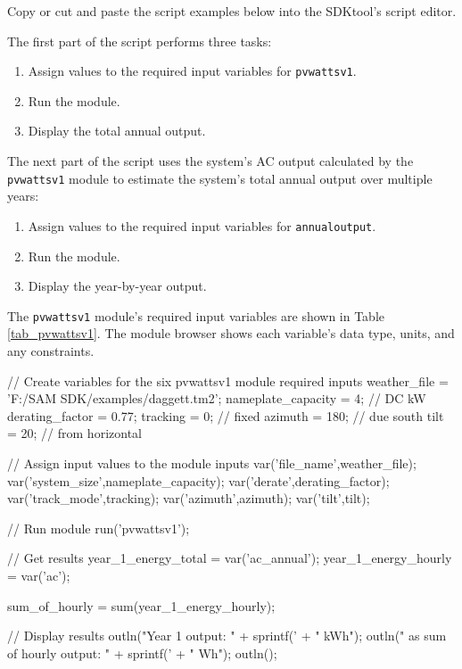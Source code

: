 \documentclass{scrartcl} %
\begin{document}
Copy or cut and paste the script examples below into the SDKtool's script editor.

The first part of the script performs three tasks:

\begin{enumerate}
\item Assign values to the required input variables for \texttt{pvwattsv1}.
\item Run the module.
\item Display the total annual output.
\end{enumerate}

The next part of the script uses the system's AC output calculated by the \texttt{pvwattsv1} module to estimate the system's total annual output over multiple years:

\begin{enumerate}
\item Assign values to the required input variables for \texttt{annualoutput}.
\item Run the module.
\item Display the year-by-year output.
\end{enumerate}

The \texttt{pvwattsv1} module's required input variables are shown in Table \ref{tab_pvwattsv1}. The module browser shows each variable's data type, units, and any constraints.

\begin{verbatimtab}

// Create variables for the six pvwattsv1 module required inputs
weather_file = 'F:/SAM SDK/examples/daggett.tm2';
nameplate_capacity = 4; // DC kW
derating_factor = 0.77;
tracking = 0; // fixed
azimuth = 180; // due south
tilt = 20; // from horizontal

// Assign input values to the module inputs
var('file_name',weather_file);
var('system_size',nameplate_capacity);
var('derate',derating_factor);
var('track_mode',tracking);
var('azimuth',azimuth);
var('tilt',tilt);

// Run module
run('pvwattsv1');

// Get results
year_1_energy_total = var('ac_annual');
year_1_energy_hourly = var('ac');

sum_of_hourly = sum(year_1_energy_hourly);

// Display results
outln("Year 1 output: " + sprintf('%
                                  + " kWh");
outln("  as sum of hourly output: " + sprintf('%
                                              + " Wh");
outln();

\end{verbatimtab}
\end{document}
